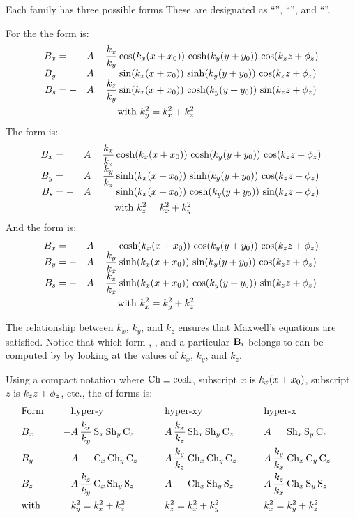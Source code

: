 Each family has three possible forms These are designated as ``'',
``'', and ``''. 

For the   the  form is:
\begin{alignat}{4}
  B_x &=  &&A \, &\dfrac{k_x}{k_y} & \cos(\kxx) \, \cosh(\kyy) \, \cos(\kzz) \CRNEG
  B_y &=  &&A \, &                 & \sin(\kxx) \, \sinh(\kyy) \, \cos(\kzz) \CRNEG
  B_s &= -&&A \, &\dfrac{k_z}{k_y} & \sin(\kxx) \, \cosh(\kyy) \, \sin(\kzz) \label{cm1} \\
  &&&&& \text{with} \,\, k_y^2 = k_x^2 + k_z^2 \nonumber
\end{alignat}
The    form is:
\begin{alignat}{4}
  B_x &=  &&A \, &\dfrac{k_x}{k_z} & \cosh(\kxx) \, \cosh(\kyy) \, \cos(\kzz) \CRNEG
  B_y &=  &&A \, &\dfrac{k_y}{k_z} & \sinh(\kxx) \, \sinh(\kyy) \, \cos(\kzz) \CRNEG
  B_s &= -&&A \, &                 & \sinh(\kxx) \, \cosh(\kyy) \, \sin(\kzz) \label{cm3} \\
  &&&&& \text{with} \,\, k_z^2 = k_x^2 + k_y^2 \nonumber
\end{alignat}
And the    form is:
\begin{alignat}{4}
  B_x &=  &&A \, &                 & \cosh(\kxx) \, \cos(\kyy) \, \cos(\kzz) \CRNEG
  B_y &= -&&A \, &\dfrac{k_y}{k_x} & \sinh(\kxx) \, \sin(\kyy) \, \cos(\kzz) \CRNEG
  B_s &= -&&A \, &\dfrac{k_z}{k_x} & \sinh(\kxx) \, \cos(\kyy) \, \sin(\kzz) \label{cm5} \\
  &&&&& \text{with} \,\, k_x^2 = k_y^2 + k_z^2 \nonumber
\end{alignat}

The relationship between $k_x$, $k_y$, and $k_z$ ensures that
Maxwell's equations are satisfied. Notice that which form
, , and  a particular ${\bf B}_i$
belongs to can be computed by \bmad by looking at the values of $k_x$,
$k_y$, and $k_z$.

Using a compact notation where $\text{Ch} \equiv \cosh$, subscript $x$ is $k_x (x + x_0)$, subscript $z$
is $k_z z + \phi_z$, etc., the   of forms is:
\begin{alignat}{7}
  & \text{Form} \quad  && \text{hyper-y} \quad && \text{hyper-xy} \quad && \text{hyper-x} \quad \CRNO
  & B_x  
    &-& A \, \dfrac{k_x}{k_y} \, \Se_x \, \Sh_y \, \Ce_z \quad
    & & A \, \dfrac{k_x}{k_z} \, \Sh_x \, \Sh_y \, \Ce_z \quad
    & & A \, \hphphp          \, \Sh_x \, \Se_y \, \Ce_z \quad \CRNO
  & B_y
    & & A \, \hphphp          \, \Ce_x \, \Ch_y \, \Ce_z \quad
    & & A \, \dfrac{k_y}{k_z} \, \Ch_x \, \Ch_y \, \Ce_z \quad
    & & A \, \dfrac{k_y}{k_x} \, \Ch_x \, \Ce_y \, \Ce_z \quad \label{family.y} \\
  & B_z
    &-& A \, \dfrac{k_z}{k_y} \, \Ce_x \, \Sh_y \, \Se_z \quad
    &-& A \, \hphphp          \, \Ch_x \, \Sh_y \, \Se_z \quad
    &-& A \, \dfrac{k_z}{k_x} \, \Ch_x \, \Se_y \, \Se_z \quad \CRNO
  & \text{with} 
    && k_y^2 = k_x^2 + k_z^2 
    && k_z^2 = k_x^2 + k_y^2
    && k_x^2 = k_y^2 + k_z^2 \nonumber
\end{alignat}


